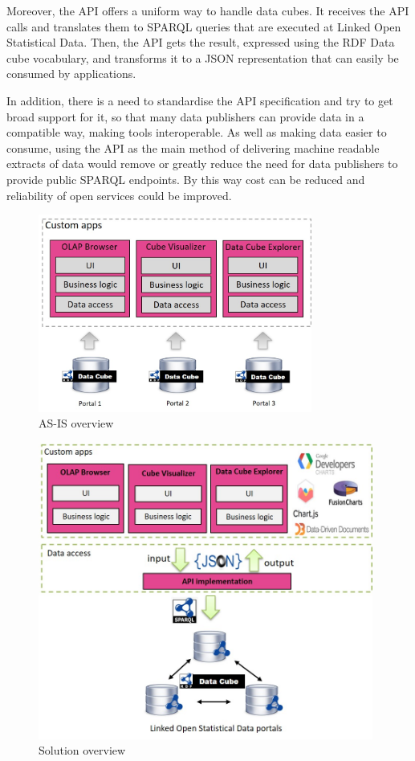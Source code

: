 \documentclass{llncs}
\begin{document}
Moreover, the API offers a uniform way to handle data cubes. It receives the API calls and translates them to SPARQL queries that are executed at Linked Open Statistical Data. Then, the API gets the result, expressed using the RDF Data cube vocabulary, and transforms it to a JSON representation that can easily be consumed by applications. 
 
In addition, there is a need to standardise the API specification and try to get broad support for it, so that many data publishers can provide data in a compatible way, making tools interoperable. As well as making data easier to consume, using the API as the main method of delivering machine readable extracts of data would remove or greatly reduce the need for data publishers to provide public SPARQL endpoints. By this way cost can be reduced and reliability of open services could be improved.

\begin{figure}
\begin{center}
  \includegraphics[width=90mm]{images/overview1.jpg}
  \end{center}
\caption{AS-IS overview}
\label{fig:overview1}
\end{figure}


\begin{figure}[h!]
  \includegraphics[width=110mm]{images/overview.jpg}
\caption{Solution overview}
\label{fig:overview}
\end{figure}
\end{document}
